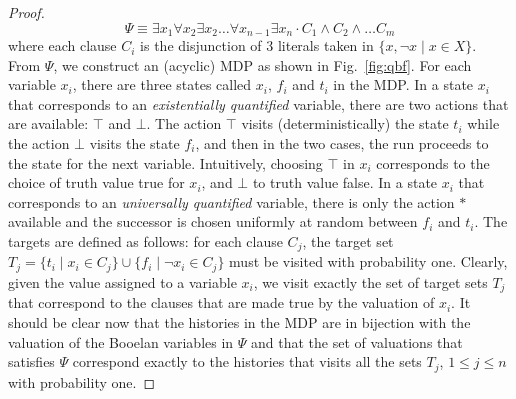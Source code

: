 \documentclass{llncs}
\begin{document}
\begin{proof}
   $$\Psi \equiv \exists x_1 \forall x_2 \exists x_2 \dots \forall x_{n-1} \exists x_n \cdot C_1 \land C_2 \land \dots C_m$$
   \noindent
    where each clause $C_i$ is the disjunction of 3 literals taken in $\{ x , \neg x \mid x \in X\}$. 
    From $\Psi$, we construct an (acyclic) MDP as shown in Fig.~\ref{fig:qbf}. For each variable $x_i$, there are three states called $x_i$, $f_i$ and $t_i$ in the MDP. In a state $x_i$ that corresponds to an {\em existentially quantified} variable, there are two actions that are available: $\top$ and $\bot$. The action $\top$ visits (deterministically) the state $t_i$ while the action $\bot$ visits the state $f_i$, and then in the two cases, the run proceeds to the state for the next variable.  Intuitively, choosing $\top$ in $x_i$ corresponds to the choice of truth value {\sf true} for $x_i$, and $\bot$ to truth value {\sf false}. In a state $x_i$ that corresponds to an {\em universally quantified} variable, there is only the action $*$ available and the successor is chosen uniformly at random between $f_i$ and $t_i$. The targets are defined as follows: for each clause $C_j$, the target set $T_j=\{ t_i \mid x_i \in C_j \} \cup \{ f_i \mid \neg x_i \in C_j \}$ must be visited with probability one. Clearly, given the value assigned to a variable $x_i$, we visit exactly the set of target sets $T_j$ that correspond to the clauses that are made true by the valuation of $x_i$. It should be clear now that the histories in the MDP are in bijection with the valuation of the Booelan variables in $\Psi$ and that the set of valuations that satisfies $\Psi$ correspond exactly to the histories that visits all the sets $T_j$, $1 \leq j \leq n$ with probability one.  
    
    


\end{proof}
\end{document}
